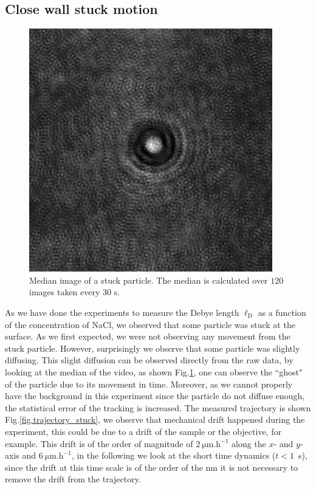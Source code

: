 \subsection{Close wall stuck motion}

\begin{figure}[H]
	\centering
	\includegraphics[scale=0.5]{02_body/chapter4/images/stucked_particle/ghost.png}
	\caption{Median image of a stuck particle. The median is calculated over $120$ images taken every $30$ s.}
	\label{fig.ghost_stucked}
\end{figure}

As we have done the experiments to measure the Debye length $\ell _\mathrm{D}$ as a function of the concentration of NaCl, we observed that some particle was stuck at the surface. As we first expected, we were not observing any movement from the stuck particle. However, surprisingly we observe that some particle was slightly diffusing. This slight diffusion can be observed directly from the raw data, by looking at the median of the video, as shown Fig.\ref{fig.ghost_stucked}, one can observe the ``ghost" of the particle due to its movement in time. Moreover, as we cannot properly have the background in this experiment since the particle do not diffuse enough, the statistical error of the tracking is increased. The measured trajectory is shown Fig.\ref{fig.trajectory_stuck}, we observe that mechanical drift happened during the experiment, this could be due to a drift of the sample or the objective, for example. This drift is of the order of magnitude of $2 ~ \mathrm{\mu m.h^{-1}}$ along the $x$- and $y$-axis and  $6 ~ \mathrm{\mu m.h^{-1}}$, in the following we look at the short time dynamics ($t < 1$~s), since the drift at this time scale is of the order of the nm it is not necessary to remove the drift from the trajectory.


